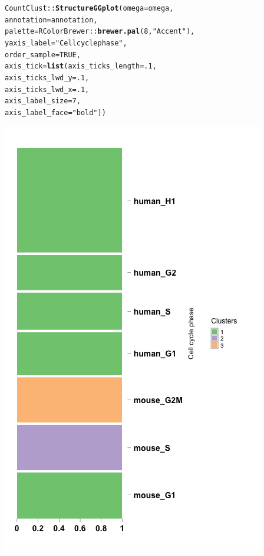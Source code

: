 \documentclass[12pt]{article}\usepackage[]{graphicx}\usepackage[usenames,dvipsnames]{color}
\makeatletter
\newcommand{\hlnum}[1]{\textcolor[rgb]{0.686,0.059,0.569}{#1}}%
\newcommand{\hlstr}[1]{\textcolor[rgb]{0.192,0.494,0.8}{#1}}%
\newcommand{\hlopt}[1]{\textcolor[rgb]{0,0,0}{#1}}%
\newcommand{\hlstd}[1]{\textcolor[rgb]{0.345,0.345,0.345}{#1}}%
\newcommand{\hlkwc}[1]{\textcolor[rgb]{0.333,0.667,0.333}{#1}}%
\newcommand{\hlkwd}[1]{\textcolor[rgb]{0.737,0.353,0.396}{\textbf{#1}}}%
\newenvironment{kframe}{%
 \def\at@end@of@kframe{}%
 \ifinner\ifhmode%
  \def\at@end@of@kframe{\end{minipage}}%
  \begin{minipage}{\columnwidth}%
 \fi\fi%
 \def\FrameCommand##1{\hskip\@totalleftmargin \hskip-\fboxsep
 \colorbox{shadecolor}{##1}\hskip-\fboxsep
     \hskip-\linewidth \hskip-\@totalleftmargin \hskip\columnwidth}%
 \MakeFramed {\advance\hsize-\width
   \@totalleftmargin\z@ \linewidth\hsize
   \@setminipage}}%
 {\par\unskip\endMakeFramed%
 \at@end@of@kframe}
\newenvironment{knitrout}{}{} %
\makeatother
\begin{document}
\begin{knitrout}
\begin{kframe}
\begin{alltt}
\hlstd{CountClust}\hlopt{::}\hlkwd{StructureGGplot}\hlstd{(}\hlkwc{omega} \hlstd{= omega,}
                \hlkwc{annotation} \hlstd{= annotation,}
                \hlkwc{palette} \hlstd{= RColorBrewer}\hlopt{::}\hlkwd{brewer.pal}\hlstd{(}\hlnum{8}\hlstd{,} \hlstr{"Accent"}\hlstd{),}
                \hlkwc{yaxis_label} \hlstd{=} \hlstr{"Cell cycle phase"}\hlstd{,}
                \hlkwc{order_sample} \hlstd{=} \hlnum{TRUE}\hlstd{,}
                \hlkwc{axis_tick} \hlstd{=} \hlkwd{list}\hlstd{(}\hlkwc{axis_ticks_length} \hlstd{=} \hlnum{.1}\hlstd{,}
                                 \hlkwc{axis_ticks_lwd_y} \hlstd{=} \hlnum{.1}\hlstd{,}
                                 \hlkwc{axis_ticks_lwd_x} \hlstd{=} \hlnum{.1}\hlstd{,}
                                 \hlkwc{axis_label_size} \hlstd{=} \hlnum{7}\hlstd{,}
                                 \hlkwc{axis_label_face} \hlstd{=} \hlstr{"bold"}\hlstd{))}
\end{alltt}
\end{kframe}
\includegraphics[width=3 in,height=5 in]{figure/structure_ortholog_classtpx_omega_fix_3-1} 

\end{knitrout}
\end{document}
